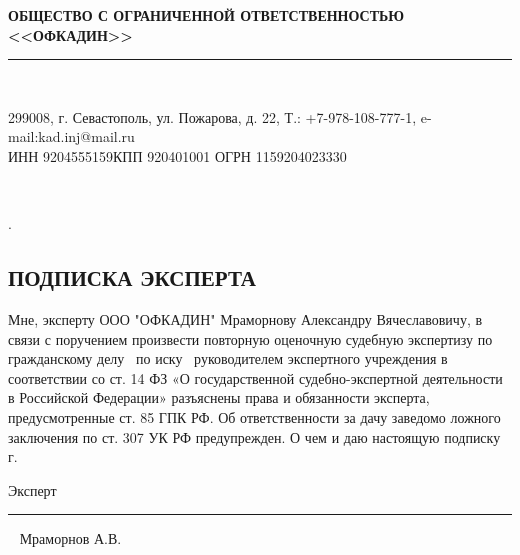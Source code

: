\setcounter{page}{1}
\pagestyle{empty} %

\begin{center}
	{\large \textbf{ОБЩЕСТВО С ОГРАНИЧЕННОЙ ОТВЕТСТВЕННОСТЬЮ \\[-1.1mm] <<ОФКАДИН>>} \\[-4.5mm]}
	\noindent\rule{\textwidth}{1pt}\\[-6mm]  %
\end{center}	

\begin{center}
	\begin{footnotesize}
		\vspace{-3mm}299008, г. Севастополь, ул. Пожарова, д. 22, %
		Т.: \quad +7-978-108-777-1, e-mail:\quad kad.inj@mail.ru\\ [-2mm]{ИНН 9204555159\quad КПП 920401001 ОГРН 1159204023330 }
	\end{footnotesize}	\\[5mm]
\end{center}
%
.
\vspace{25mm}

\begin{center}
	\section{{\Large \textbf{ПОДПИСКА      ЭКСПЕРТА}}}
\end{center}



Мне, эксперту ООО "ОФКАДИН"  Мраморнову Александру Вячеславовичу, в связи с поручением произвести повторную оценочную судебную экспертизу по  гражданскому делу \delonum \, по иску \isk \,  руководителем экспертного учреждения в соответствии со ст. 14 ФЗ «О государственной судебно-экспертной деятельности в Российской Федерации» разъяснены права и обязанности эксперта, предусмотренные ст. 85 ГПК РФ. 
Об ответственности за дачу заведомо ложного заключения по ст. 307 УК РФ предупрежден.  О  чем и даю настоящую подписку \datastart г.





\vspace{35mm}

{Эксперт}\hfill      \rule{4cm}{0.1 mm} \,\,\,      {Мраморнов А.В.}